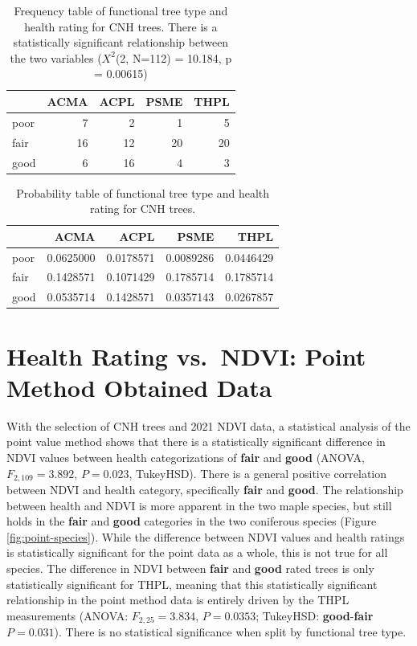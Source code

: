 \documentclass[12pt,twoside]{reedthesis}
\begin{document}
\begin{longtable}[t]{lrrrr}
\caption[Frequency table of functional tree type and health rating for CNH trees]{\label{tab:table-freq-test-3}Frequency table of functional tree type and health rating for CNH trees. There is a statistically significant relationship between the two variables ($X^2$(2, N=112) = 10.184, p = 0.00615)}\\
\toprule
  & ACMA & ACPL & PSME & THPL\\
\midrule
poor & 7 & 2 & 1 & 5\\
fair & 16 & 12 & 20 & 20\\
good & 6 & 16 & 4 & 3\\
\bottomrule
\end{longtable}
\begin{longtable}[t]{lrrrr}
\caption[Probability table of functional tree type and health rating for CNH trees]{\label{tab:table-freq-test-4}Probability table of functional tree type and health rating for CNH trees.}\\
\toprule
  & ACMA & ACPL & PSME & THPL\\
\midrule
poor & 0.0625000 & 0.0178571 & 0.0089286 & 0.0446429\\
fair & 0.1428571 & 0.1071429 & 0.1785714 & 0.1785714\\
good & 0.0535714 & 0.1428571 & 0.0357143 & 0.0267857\\
\bottomrule
\end{longtable}
\hypertarget{health-rating-vs.-ndvi-point-method-obtained-data}{%
\section{Health Rating vs.~NDVI: Point Method Obtained Data}\label{health-rating-vs.-ndvi-point-method-obtained-data}}

With the selection of CNH trees and 2021 NDVI data, a statistical
analysis of the point value method shows that there is a statistically
significant difference in NDVI values between health categorizations of
\textbf{fair} and \textbf{good} (ANOVA, \(F_{2, 109} = 3.892\), \(P = 0.023\),
TukeyHSD). There is a general positive correlation between NDVI and
health category, specifically \textbf{fair} and \textbf{good}. The relationship
between health and NDVI is more apparent in the two maple species, but
still holds in the \textbf{fair} and \textbf{good} categories in the two
coniferous species (Figure \ref{fig:point-species}). While the
difference between NDVI values and health ratings is statistically
significant for the point data as a whole, this is not true for all
species. The difference in NDVI between \textbf{fair} and \textbf{good} rated
trees is only statistically significant for THPL, meaning that this
statistically significant relationship in the point method data is
entirely driven by the THPL measurements (ANOVA: \(F_{2, 25} = 3.834\),
\(P = 0.0353\); TukeyHSD: \textbf{good}-\textbf{fair} \(P = 0.031\)). There is no
statistical significance when split by functional tree type.
\end{document}
